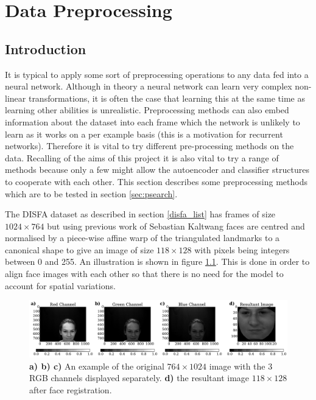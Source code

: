 \chapter{Data Preprocessing}
  \section{Introduction}
    It is typical to apply some sort of preprocessing operations to any data fed into
    a neural network. Although in theory a neural network can learn very complex
    non-linear transformations, it is often the case that learning this at the same
    time as learning other abilities is unrealistic. Preprocessing methods can
    also embed information about the dataset into each frame which the network is
    unlikely to learn as it works on a per example basis (this is a motivation for
    recurrent networks).
     Therefore it is vital to try
    different pre-processing methods on the data.
    Recalling of the aims of this project it is also vital to try a range of methods
    because only a few
    might allow the autoencoder and classifier structures to cooperate with each other.
    This section describes some preprocessing methods which are to be
    tested in section \ref{sec:psearch}.


    The DISFA dataset as described in section \ref{disfa_list} has frames of size $ 1024 \times 764 $
    but using previous work of Sebastian Kaltwang\cite{Kaltwang2015} faces are
    centred and normalised by a piece-wise affine warp of the triangulated
    landmarks to a canonical shape to give an image of size $118 \times 128$
    with pixels being integers between
    0 and 255. An illustration is shown in figure \ref{fig:sebproc}.
    This is done in order to align face images with each other so that
    there is no need for the model to account for spatial variations.

    \begin{figure}[!h] \centering
    \includegraphics[width =\hsize]{figures/seb_preproc.pdf}
    \caption{ {\bf a) b) c)} An example of the original $764 \times 1024$ image with
    the 3 RGB channels displayed separately. {\bf d)} the resultant image
    $118 \times 128$ after face registration.} \label{fig:sebproc} \end{figure}


